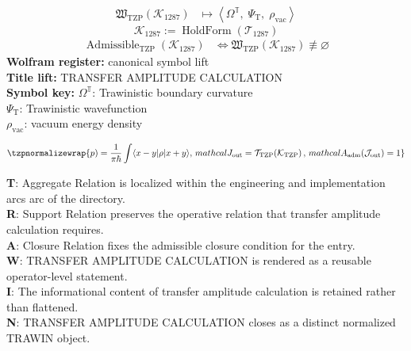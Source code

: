 \noindent
\begin{minipage}[t]{0.48\linewidth}
\begingroup
\small
\[
\begin{aligned}
\mathfrak{W}_{\mathrm{TZP}}\!\left(\mathcal{K}_{1287}\right)
&\longmapsto
\left\langle \Omega^{\mathbb{T}},\; \Psi_{\mathrm{T}},\; \rho_{\mathrm{vac}} \right\rangle
\end{aligned}
\]
\[
\mathcal{K}_{1287}
:=
\operatorname{HoldForm}\!\left(\mathcal{T}_{1287}\right)
\]
\[
\begin{aligned}
\operatorname{Admissible}_{\mathrm{TZP}}\!\left(\mathcal{K}_{1287}\right)
&\Longleftrightarrow
\mathfrak{W}_{\mathrm{TZP}}\!\left(\mathcal{K}_{1287}\right)\not\equiv\varnothing
\end{aligned}
\]
\textbf{Wolfram register:} canonical symbol lift\\
\textbf{Title lift:} TRANSFER AMPLITUDE CALCULATION\\
\textbf{Symbol key:} \(\Omega^{\mathbb{T}}\): Trawinistic boundary curvature\\ \(\Psi_{\mathrm{T}}\): Trawinistic wavefunction\\ \(\rho_{\mathrm{vac}}\): vacuum energy density
\par
\endgroup
\end{minipage}\hfill
\begin{minipage}[t]{0.48\linewidth}
\[
\tzpnormalizewrap{p) = \frac{1}{\pi\hbar} \int \langle x-y|\rho\lvert x+y \rangle,\,mathcal{J}_{\mathrm{out}} = \mathcal{T}_{\mathrm{TZP}}\!\left(\mathcal{K}_{\mathrm{TZP}}\right),\,mathcal{A}_{\mathrm{adm}}\!\left(\mathcal{J}_{\mathrm{out}}\right)=1}
\]

\small
\textbf{T}: Aggregate Relation is localized within the engineering and implementation arcs arc of the directory.\\
\textbf{R}: Support Relation preserves the operative relation that transfer amplitude calculation requires.\\
\textbf{A}: Closure Relation fixes the admissible closure condition for the entry.\\
\textbf{W}: TRANSFER AMPLITUDE CALCULATION is rendered as a reusable operator-level statement.\\
\textbf{I}: The informational content of transfer amplitude calculation is retained rather than flattened.\\
\textbf{N}: TRANSFER AMPLITUDE CALCULATION closes as a distinct normalized TRAWIN object.
\normalsize
\end{minipage}

